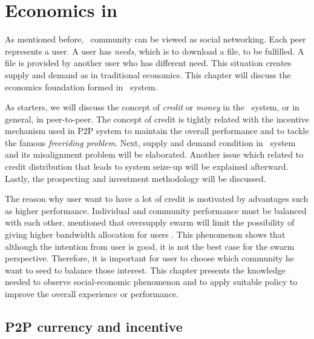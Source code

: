\chapter{Economics in \bt}

As mentioned before, \bt~community can be viewed as social networking. Each peer represents a user. A user has \textit{needs}, which is to download a file, to be fulfilled. A file is provided by another user who has different need. This situation creates supply and demand as in traditional economics. This chapter will discuss the economics foundation formed in \bt~system.

As starters, we will discuss the concept of \textit{credit} or \textit{money} in the \bt~system, or in general, in peer-to-peer. The concept of credit is tightly related with the incentive mechanism used in P2P system to maintain the overall performance and to tackle the famous \textit{freeriding problem}. Next, supply and demand condition in \bt~system and its misalignment problem will be elaborated. Another issue which related to credit distribution that leads to system seize-up will be explained afterward. Lastly, the prospecting and investment methodology will be discussed.

The reason why user want to have a lot of credit is motivated by advantages such as higher performance. Individual and community performance must be balanced with each other. \citeauthor{2013:survivepriv:jia} mentioned that oversupply swarm will limit the possibility of giving higher bandwidth allocation for users \cite{2013:survivepriv:jia}. This phenomenon shows that although the intention from user is good, it is not the best case for the swarm perspective. Therefore, it is important for user to choose which community he want to seed to balance those interest. This chapter presents the knowledge needed to observe social-economic phenomenon and to apply suitable policy to improve the overall experience or performance.



\section{P2P currency and incentive}

